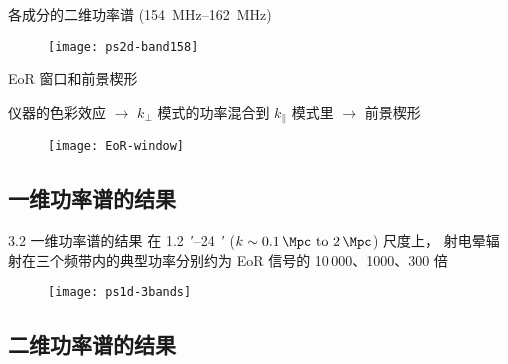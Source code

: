 \documentclass{beamer}
\begin{document}
\begin{frame}[t]
  \begin{alertblock}{各成分的二维功率谱 ({\normalfont \SIrange{154}{162}{\MHz}})}
  \end{alertblock}
  \begin{figure}
    \centering
    \texttt{[image: ps2d-band158]}
  \end{figure}
\end{frame}

\begin{frame}[t]
  \begin{alertblock}{EoR 窗口和前景楔形}
  \end{alertblock}
  仪器的色彩效应 $\rightarrow$
  $k_{\perp}$ 模式的功率混合到 $k_{\parallel}$ 模式里 $\rightarrow$
  前景楔形
  \begin{figure}
    \centering
    \texttt{[image: EoR-window]}
  \end{figure}
\end{frame}

\subsection{一维功率谱的结果}

\begin{frame}{3.2 一维功率谱的结果}
  在 \SI{1.2}{\arcminute}--\SI{24}{\arcminute}
  ($k \sim \SIrange{0.1}{2}{\per\Mpc}$) 尺度上，
  射电晕辐射在三个频带内的典型功率分别约为 EoR 信号的
  10\,000、1000、300 倍

  \begin{figure}
    \centering
    \texttt{[image: ps1d-3bands]}
  \end{figure}
\end{frame}

\subsection{二维功率谱的结果}
\end{document}
